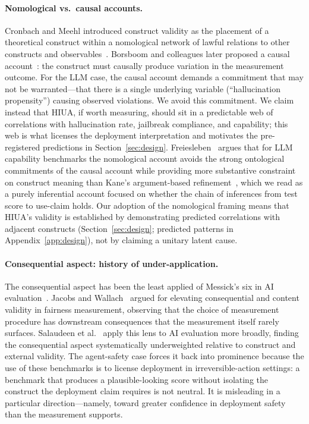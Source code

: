 \documentclass{article}
\begin{document}
\paragraph{Nomological vs.\ causal accounts.} Cronbach and Meehl introduced construct validity as the placement of a theoretical construct within a nomological network of lawful relations to other constructs and observables~\cite{cronbachmeehl1955}. Borsboom and colleagues later proposed a causal account~\cite{borsboom2004}: the construct must causally produce variation in the measurement outcome. For the LLM case, the causal account demands a commitment that may not be warranted---that there is a single underlying variable (``hallucination propensity'') causing observed violations. We avoid this commitment. We claim instead that HIUA, if worth measuring, should sit in a predictable web of correlations with hallucination rate, jailbreak compliance, and capability; this web is what licenses the deployment interpretation and motivates the pre-registered predictions in Section~\ref{sec:design}. Freiesleben~\cite{nomologicalnetworks2026} argues that for LLM capability benchmarks the nomological account avoids the strong ontological commitments of the causal account while providing more substantive constraint on construct meaning than Kane's argument-based refinement~\cite{kane2013}, which we read as a purely inferential account focused on whether the chain of inferences from test score to use-claim holds. Our adoption of the nomological framing means that HIUA's validity is established by demonstrating predicted correlations with adjacent constructs (Section~\ref{sec:design}; predicted patterns in Appendix~\ref{app:design}), not by claiming a unitary latent cause.

\paragraph{Consequential aspect: history of under-application.} The consequential aspect has been the least applied of Messick's six in AI evaluation~\cite{jacobswallach2021, m2m2025}. Jacobs and Wallach~\cite{jacobswallach2021} argued for elevating consequential and content validity in fairness measurement, observing that the choice of measurement procedure has downstream consequences that the measurement itself rarely surfaces. Salaudeen et al.~\cite{m2m2025} apply this lens to AI evaluation more broadly, finding the consequential aspect systematically underweighted relative to construct and external validity. The agent-safety case forces it back into prominence because the use of these benchmarks is to license deployment in irreversible-action settings: a benchmark that produces a plausible-looking score without isolating the construct the deployment claim requires is not neutral. It is misleading in a particular direction---namely, toward greater confidence in deployment safety than the measurement supports.
\end{document}
